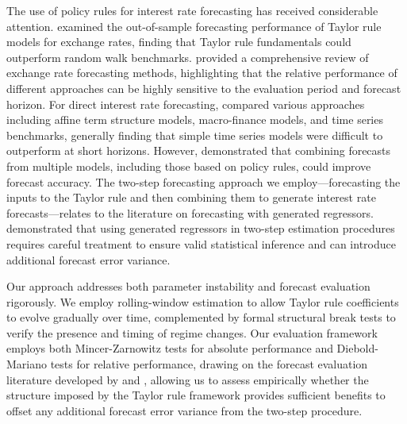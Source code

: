 \par The use of policy rules for interest rate forecasting has received considerable attention. \cite{molodtsova2009taylor} examined the out-of-sample forecasting performance of Taylor rule models for exchange rates, finding that Taylor rule fundamentals could outperform random walk benchmarks. \cite{rossi2013advances} provided a comprehensive review of exchange rate forecasting methods, highlighting that the relative performance of different approaches can be highly sensitive to the evaluation period and forecast horizon. For direct interest rate forecasting, \cite{ang2003noarbitrage} compared various approaches including affine term structure models, macro-finance models, and time series benchmarks, generally finding that simple time series models were difficult to outperform at short horizons. However, \cite{mccracken2016fred} demonstrated that combining forecasts from multiple models, including those based on policy rules, could improve forecast accuracy. The two-step forecasting approach we employ—forecasting the inputs to the Taylor rule and then combining them to generate interest rate forecasts—relates to the literature on forecasting with generated regressors. \cite{pagan1984econometric} demonstrated that using generated regressors in two-step estimation procedures requires careful treatment to ensure valid statistical inference and can introduce additional forecast error variance.
\par Our approach addresses both parameter instability and forecast evaluation rigorously. We employ rolling-window estimation to allow Taylor rule coefficients to evolve gradually over time, complemented by formal structural break tests \citep{chowTestsEqualitySets1960, baiEstimatingTestingLinear1998} to verify the presence and timing of regime changes. Our evaluation framework employs both Mincer-Zarnowitz tests for absolute performance and Diebold-Mariano tests for relative performance, drawing on the forecast evaluation literature developed by \cite{diebold1995comparing} and \cite{west1996asymptotic}, allowing us to assess empirically whether the structure imposed by the Taylor rule framework provides sufficient benefits to offset any additional forecast error variance from the two-step procedure.
